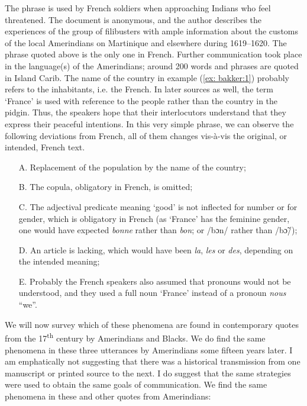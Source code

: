 \documentclass[output=paper,colorlinks,citecolor=brown]{langscibook}
\begin{document}
The phrase is used by French soldiers when approaching Indians who feel threatened. The document is anonymous, and the author describes the experiences of the group of filibusters with ample information about the customs of the local Amerindians on Martinique and elsewhere during 1619--1620. The phrase quoted above is the only one in French. Further communication took place in the language(s) of the Amerindians; around 200 words and phrases are quoted in Island Carib.
The name of the country in example (\ref{ex: bakker:1}) probably refers to the inhabitants, i.e. the French. In later sources as well, the term ‘France’ is used with reference to the people rather than the country in the pidgin. Thus, the speakers hope that their interlocutors understand that they express their peaceful intentions.
In this very simple phrase, we can observe the following deviations from French, all of them changes vis-à-vis the original, or intended, French text.

\ea%
\begin{itemize}
    \item[A.] Replacement of the population by the name of the country;
    \item[B.] The copula, obligatory in French, is omitted;
    \item[C.] The adjectival predicate meaning ‘good’ is not inflected for number or for gender, which is obligatory in French (as ‘France’ has the feminine gender, one would have expected \textit{bonne} rather than \textit{bon}; or /bɔn/ rather than /b\~{ɔ}/);
    \item[D.] An article is lacking, which would have been \textit{la}, \textit{les} or \textit{des}, depending on the intended meaning;
    \item[E.] Probably the French speakers also assumed that pronouns would not be understood, and they used a full noun `France'  instead of a pronoun \textit{nous} “we”.
\end{itemize}
\z


We will now survey which of these phenomena are found in contemporary quotes from the 17\textsuperscript{th} century by Amerindians and Blacks. We do find the same phenomena in these three utterances by Amerindians some fifteen years later. I am emphatically not suggesting that there was a historical transmission from one manuscript or printed source to the next. I do suggest that the same strategies were used to obtain the same goals of communication. We find the same phenomena in these and other quotes from Amerindians:
\end{document}
